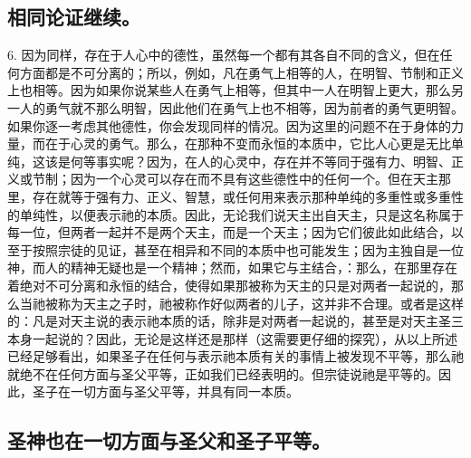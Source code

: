 
\subsection{相同论证继续。}

6. 因为同样，存在于人心中的德性，虽然每一个都有其各自不同的含义，但在任何方面都是不可分离的；所以，例如，凡在勇气上相等的人，在明智、节制和正义上也相等。因为如果你说某些人在勇气上相等，但其中一人在明智上更大，那么另一人的勇气就不那么明智，因此他们在勇气上也不相等，因为前者的勇气更明智。如果你逐一考虑其他德性，你会发现同样的情况。因为这里的问题不在于身体的力量，而在于心灵的勇气。那么，在那种不变而永恒的本质中，它比人心更是无比单纯，这该是何等事实呢？因为，在人的心灵中，存在并不等同于强有力、明智、正义或节制；因为一个心灵可以存在而不具有这些德性中的任何一个。但在天主那里，存在就等于强有力、正义、智慧，或任何用来表示那种单纯的多重性或多重性的单纯性，以便表示祂的本质。因此，无论我们说天主出自天主，只是这名称属于每一位，但两者一起并不是两个天主，而是一个天主；因为它们彼此如此结合，以至于按照宗徒的见证，甚至在相异和不同的本质中也可能发生；因为主独自是一位神，而人的精神无疑也是一个精神；然而，如果它与主结合，：那么，在那里存在着绝对不可分离和永恒的结合，使得如果那被称为天主的只是对两者一起说的，那么当祂被称为天主之子时，祂被称作好似两者的儿子，这并非不合理。或者是这样的：凡是对天主说的表示祂本质的话，除非是对两者一起说的，甚至是对天主圣三本身一起说的？因此，无论是这样还是那样（这需要更仔细的探究），从以上所述已经足够看出，如果圣子在任何与表示祂本质有关的事情上被发现不平等，那么祂就绝不在任何方面与圣父平等，正如我们已经表明的。但宗徒说祂是平等的。因此，圣子在一切方面与圣父平等，并具有同一本质。\par


\subsection{圣神也在一切方面与圣父和圣子平等。}

